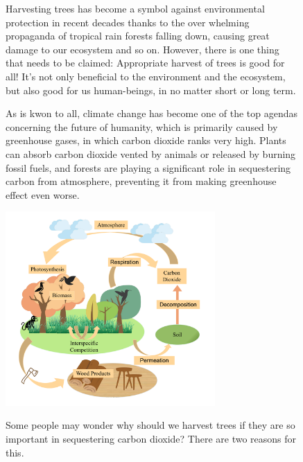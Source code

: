 \documentclass{mcmthesis}
\numberwithin{figure}{section}
\numberwithin{table}{section}
\numberwithin{equation}{section}
\begin{document}
\newpage


\memodate{\today}

\begin{memo}

  \begin{figure}[ht]
    \hfill
    \begin{minipage}[htbp]{0.475\linewidth}
      \indent\setlength{\parindent}{1em}
      \par
      Harvesting trees has become a symbol against environmental protection in recent decades
      thanks to the over whelming propaganda of tropical rain forests falling down, causing
      great damage to our ecosystem and so on. However, there is one thing that needs to be 
      claimed: Appropriate harvest of trees is good for all! It's not only beneficial to
      the environment and the ecosystem, but also good for us human-beings, in no matter
      short or long term.
      \par
      As is kwon to all, climate change has become one of the top agendas concerning the 
      future of humanity, which is primarily caused by greenhouse gases, in which carbon
      dioxide ranks very high. Plants can absorb carbon dioxide vented by animals or released
      by burning fossil fuels, and forests are playing a significant role in sequestering
      carbon from atmosphere, preventing it from making greenhouse effect even worse. 
      \par
      \includegraphics[width = 8cm]{code&pic/大循环.pdf}
      \par
      Some people may wonder why should we harvest trees if they are so important in sequestering
      carbon dioxide? There are two reasons for this.  

\end{minipage}
\end{figure}
\end{memo}
\end{document}
